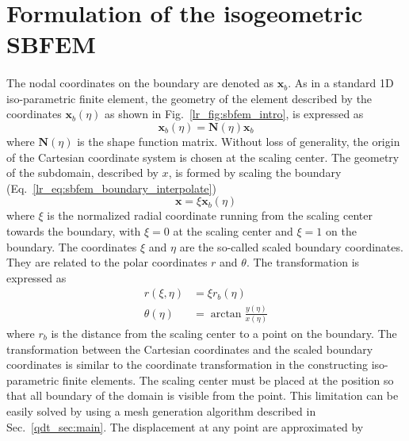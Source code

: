 \section{Formulation of the isogeometric SBFEM}
\label{iso_section:formulation}
\paragraph{}
The nodal coordinates on the boundary are denoted as $\mathbf{x}_b$. As in a standard 1D iso-parametric finite element, the geometry of the element described by the coordinates $\mathbf{x}_b(\eta)$ as shown in Fig.~\ref{lr_fig:sbfem_intro}, is expressed as
\begin{equation}
    \mathbf{x}_b(\eta) = \mathbf{N}(\eta) \mathbf{x}_b
    \label{lr_eq:sbfem_boundary_interpolate}
\end{equation}
%
where $\mathbf{N}(\eta)$ is the shape function matrix.
Without loss of generality, the origin of the Cartesian coordinate system is chosen at the scaling center.
The geometry of the subdomain, described by $x$, is formed by scaling the boundary (Eq.~\ref{lr_eq:sbfem_boundary_interpolate})
\begin{equation}
    \mathbf{x} = \xi \mathbf{x}_b (\eta)
    \label{lr_eq:sbfem_scaling}
\end{equation}
%
where $\xi$ is the normalized radial coordinate running from the scaling center towards the boundary, with $\xi=0$ at the scaling center and $\xi=1$ on the boundary.
The coordinates $\xi$ and $\eta$ are the so-called scaled boundary coordinates.
They are related to the polar coordinates $r$ and $\theta$.
The transformation is expressed as
\begin{equation}
\begin{aligned}
    r(\xi,\eta) &= \xi r_b(\eta)     \\
    \theta(\eta) &= \arctan \frac{y(\eta)}{x(\eta)}
    \label{lr_eq:sbfem_transform}
\end{aligned}
\end{equation}
%
where $r_b$ is the distance from the scaling center to a point on the boundary.
The transformation between the Cartesian coordinates and the scaled boundary coordinates is similar to the coordinate transformation in the constructing iso-parametric finite elements.
The scaling center must be placed at the position so that all boundary of the domain is visible from the point.
This limitation can be easily solved by using a mesh generation algorithm described in Sec.~\ref{qdt_sec:main}.
The displacement at any point are approximated by
